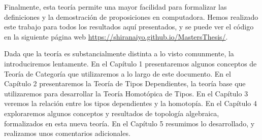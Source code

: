 \documentclass[../main.tex]{subfiles}
\begin{document}
Finalmente, esta teor\'ia permite una mayor facilidad para formalizar las definiciones y la demostraci\'on de proposiciones en computadora.
Hemos realizado este trabajo para todos los resultados aqu\'i presentados, y se puede ver el c\'odigo en la siguiente p\'agina web \url{https://shiranaiyo.github.io/MastersThesis/}.

Dada que la teor\'ia es substancialmente distinta a lo visto comunmente, la introduciremos lentamente.
En el Cap\'itulo 1 presentaremos algunos conceptos de Teor\'ia de Categor\'ia que utilizaremos a lo largo de este documento. En el Cap\'itulo 2 presentaremos la Teor\'ia de Tipos Dependientes, la teor\'ia base que utilizaremos para desarrollar la Teor\'ia Homot\'opica de Tipos. En el Cap\'itulo 3 veremos la relación entre los tipos dependientes y la homotop\'ia. En el Cap\'itulo 4 exploraremos algunos conceptos y resultados de topolog\'ia algebraica, formalizados en esta nueva teor\'ia.
En el Cap\'itulo 5 resumimos lo desarrollado, y realizamos unos comentarios adicionales.
\end{document}
